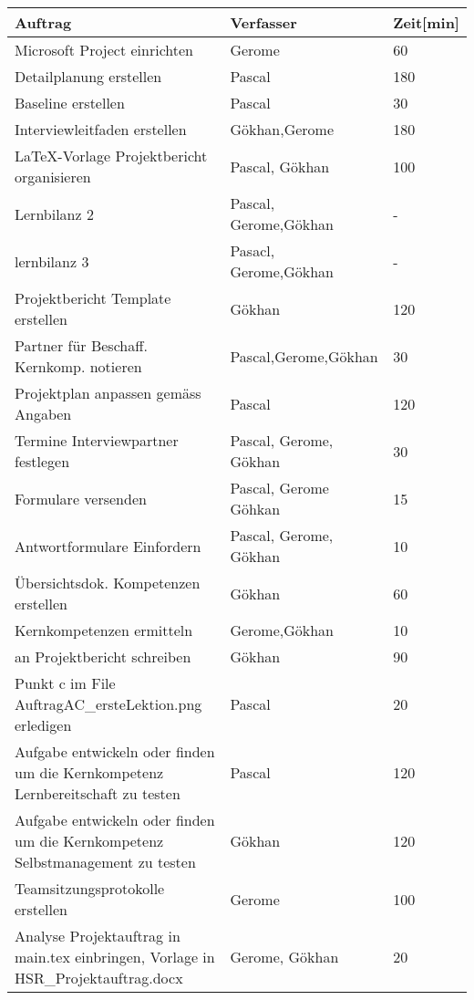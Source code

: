  \begin{longtable}{ | p{7cm} | p{4cm} | p{2cm} |}
   \hline
   \textbf{Auftrag} & \textbf{Verfasser} & \textbf{Zeit[min]}   \\
   \hline  		
    Microsoft Project einrichten & Gerome & 60 \\ \hline
    Detailplanung erstellen & Pascal & 180 \\ \hline
    Baseline erstellen  & Pascal & 30 \\ \hline
    Interviewleitfaden erstellen& Gökhan,Gerome & 180 \\ \hline
    LaTeX-Vorlage Projektbericht organisieren & Pascal, Gökhan & 100 \\ \hline
    Lernbilanz 2 & Pascal, Gerome,Gökhan & - \\ \hline
    lernbilanz 3 & Pasacl, Gerome,Gökhan & - \\ \hline
    Projektbericht Template erstellen & Gökhan & 120 \\ \hline
    Partner für Beschaff. Kernkomp. notieren & Pascal,Gerome,Gökhan & 30 \\ \hline
    Projektplan anpassen gemäss Angaben & Pascal & 120 \\ \hline
    Termine Interviewpartner festlegen & Pascal, Gerome, Gökhan & 30 \\ \hline
    Formulare versenden & Pascal, Gerome Göhkan & 15 \\ \hline
    Antwortformulare Einfordern & Pascal, Gerome, Gökhan & 10 \\ \hline
    Übersichtsdok. Kompetenzen erstellen & Gökhan & 60 \\ \hline    
    Kernkompetenzen ermitteln & Gerome,Gökhan & 10 \\ \hline   
    an Projektbericht schreiben & Gökhan & 90 \\ \hline   
    Punkt c im File AuftragAC\_ersteLektion.png erledigen & Pascal & 20 \\ \hline    
    Aufgabe entwickeln oder finden um die Kernkompetenz Lernbereitschaft zu testen  & Pascal & 120 \\ \hline   
    Aufgabe entwickeln oder finden um die Kernkompetenz Selbstmanagement zu testen  & Gökhan & 120 \\ \hline  
    Teamsitzungsprotokolle erstellen & Gerome & 100 \\ \hline    
    Analyse Projektauftrag in main.tex einbringen, Vorlage in HSR\_Projektauftrag.docx & Gerome, Gökhan & 20\\ \hline   

\end{longtable}
